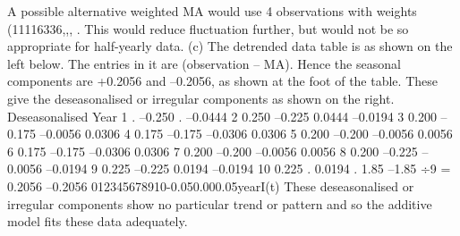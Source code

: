 \documentclass[a4paper,12pt]{article}
\begin{document}
\begin{enumerate}
A possible alternative weighted MA would use 4 observations with weights (11116336,,, . This would reduce fluctuation further, but would not be so appropriate for half-yearly data.
(c) The detrended data table is as shown on the left below. The entries in it are (observation – MA). Hence the seasonal components are +0.2056 and –0.2056, as shown at the foot of the table. These give the deseasonalised or irregular components as shown on the right.
Deseasonalised
Year 1
.
–0.250
.
–0.0444
2
0.250
–0.225
0.0444
–0.0194
3
0.200
–0.175
–0.0056
0.0306
4
0.175
–0.175
–0.0306
0.0306
5
0.200
–0.200
–0.0056
0.0056
6
0.175
–0.175
–0.0306
0.0306
7
0.200
–0.200
–0.0056
0.0056
8
0.200
–0.225
–0.0056
–0.0194
9
0.225
–0.225
0.0194
–0.0194
10
0.225
.
0.0194
.
1.85
–1.85
÷9 =
0.2056
–0.2056
012345678910-0.050.000.05yearI(t)
These deseasonalised or irregular components show no particular trend or pattern and so the additive model fits these data adequately.
\end{enumerate}
\end{document}
